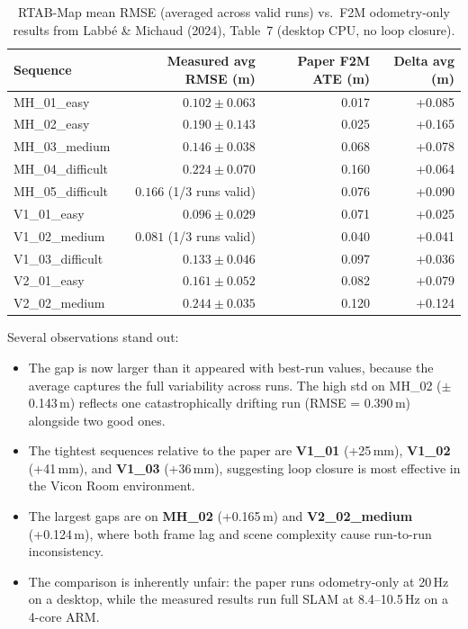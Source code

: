 \documentclass[11pt]{article}
\begin{document}
\begin{table}[H]
\centering
\small
\caption{RTAB-Map mean RMSE (averaged across valid runs) vs.\ F2M odometry-only results from Labb{\'e} \& Michaud (2024), Table~7 (desktop CPU, no loop closure).}
\label{tab:rtabmap_vs_paper}
\begin{tabular}{lrrr}
\toprule
Sequence & Measured avg RMSE (m) & Paper F2M ATE (m) & Delta avg (m) \\
\midrule
MH\_01\_easy       & $0.102 \pm 0.063$ & 0.017 & +0.085 \\
MH\_02\_easy       & $0.190 \pm 0.143$ & 0.025 & +0.165 \\
MH\_03\_medium     & $0.146 \pm 0.038$ & 0.068 & +0.078 \\
MH\_04\_difficult  & $0.224 \pm 0.070$ & 0.160 & +0.064 \\
MH\_05\_difficult  & $0.166$ (1/3 runs valid) & 0.076 & +0.090 \\
V1\_01\_easy       & $0.096 \pm 0.029$ & 0.071 & +0.025 \\
V1\_02\_medium     & $0.081$ (1/3 runs valid) & 0.040 & +0.041 \\
V1\_03\_difficult  & $0.133 \pm 0.046$ & 0.097 & +0.036 \\
V2\_01\_easy       & $0.161 \pm 0.052$ & 0.082 & +0.079 \\
V2\_02\_medium     & $0.244 \pm 0.035$ & 0.120 & +0.124 \\
\bottomrule
\end{tabular}
\end{table}

Several observations stand out:
\begin{itemize}
    \item The gap is now larger than it appeared with best-run values, because the average captures the full variability across runs. The high std on MH\_02 ($\pm$0.143\,m) reflects one catastrophically drifting run (RMSE = 0.390\,m) alongside two good ones.
    \item The tightest sequences relative to the paper are \textbf{V1\_01} (+25\,mm), \textbf{V1\_02} (+41\,mm), and \textbf{V1\_03} (+36\,mm), suggesting loop closure is most effective in the Vicon Room environment.
    \item The largest gaps are on \textbf{MH\_02} (+0.165\,m) and \textbf{V2\_02\_medium} (+0.124\,m), where both frame lag and scene complexity cause run-to-run inconsistency.
    \item The comparison is inherently unfair: the paper runs odometry-only at 20\,Hz on a desktop, while the measured results run full SLAM at 8.4--10.5\,Hz on a 4-core ARM.
\end{itemize}
\end{document}
